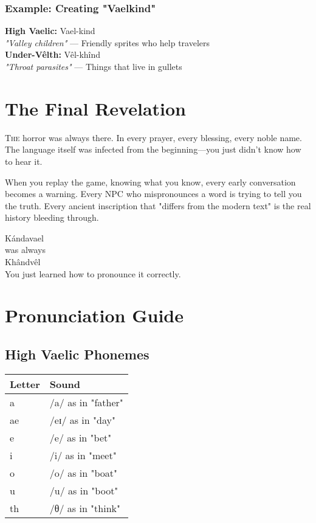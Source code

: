 \documentclass[11pt,a4paper,twoside]{book}
\begin{document}
\subsection{Example: Creating "Vaelkind"}

\begin{tcolorbox}[width=\textwidth]
\textbf{High Vaelic:} Vael-kind\\
\textit{"Valley children"} — Friendly sprites who help travelers\\
\vspace{0.5em}
\textbf{Under-Vêlth:} Vêl-khînd\\
\textit{"Throat parasites"} — Things that live in gullets
\end{tcolorbox}

\chapter{The Final Revelation}

\lettrine[lines=4]{\color{blood}T}{he} horror was always there. In every prayer, every blessing, every noble name. The language itself was infected from the beginning—you just didn't know how to hear it.

When you replay the game, knowing what you know, every early conversation becomes a warning. Every NPC who mispronounces a word is trying to tell you the truth. Every ancient inscription that "differs from the modern text" is the real history bleeding through.

\begin{center}
\Huge\displayfont
Kándavael\\
\normalsize
was always\\
\Huge\runefont
Khândvêl\\
\normalsize
\vspace{1em}
You just learned how to pronounce it correctly.
\end{center}

\appendix

\chapter{Pronunciation Guide}

\section{High Vaelic Phonemes}

\begin{tabular}{ll}
\textbf{Letter} & \textbf{Sound} \\
\hline
a & /a/ as in "father" \\
ae & /eɪ/ as in "day" \\
e & /e/ as in "bet" \\
i & /i/ as in "meet" \\
o & /o/ as in "boat" \\
u & /u/ as in "boot" \\
th & /θ/ as in "think" \\
\end{tabular}
\end{document}
